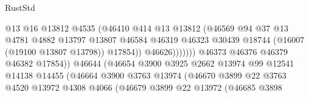 \begin{lexlean}{RustStd}
\begin{coremodule}
                                              @13
                                              @16
                                              @13812
                                              @4535
                                              (@46410
                                                @414
                                                @13
                                                @13812
                                                (@46569
                                                  @94
                                                  @37
                                                  @13
                                                  @4781
                                                  @4882
                                                  @13797
                                                  @13807
                                                  @46584
                                                  @46319
                                                  @46323
                                                  @30439
                                                  @18744
                                                  (@16007 (@19100 @13807 @13798))
                                                  @17854))
                                              @46626)))))))
                                @46373
                                @46376
                                @46379
                                @46382
                                @17854))
                            @46644
                            (@46654
                              @3900
                              @3925
                              @2662
                              @13974
                              @99
                              @12541
                              @14138
                              @14455
                              (@46664
                                @3900
                                @3763
                                @13974
                                (@46670
                                  @3899
                                  @22
                                  @3763
                                  @4520
                                  @13972
                                  @4308
                                  @4066
                                  (@46679
                                    @3899
                                    @22
                                    @13972
                                    (@46685
                                      @3898

\end{coremodule}
\end{lexlean}
